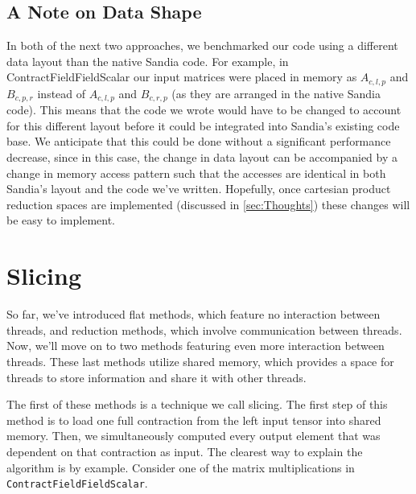 
\subsection{A Note on Data Shape}
In both of the next two approaches, we benchmarked our code using a different data layout than the native
Sandia code. For example, in ContractFieldFieldScalar our input matrices were placed in memory as $A_{c,l,p}$ and
$B_{c,p,r}$ instead of $A_{c,l,p}$ and $B_{c,r,p}$ (as they are arranged in the native Sandia code).
This means that the code we wrote would have to be changed to account for this different layout
before it could be integrated into Sandia's existing code base. We anticipate that this could be done without a
significant performance decrease, since in this case, the change in data layout can be accompanied by a change in 
memory access pattern such that the accesses are identical in both Sandia's layout and the code we've written.
Hopefully, once cartesian product reduction spaces are implemented (discussed in \ref{sec:Thoughts}) these 
changes will be easy to implement. 
\section{Slicing} \label{sec:Slicing}
So far, we've introduced flat methods, which feature no interaction between threads, and reduction
methods, which involve communication between threads. Now, we'll move on to two methods
featuring even more interaction between threads. These last methods utilize shared memory, 
which provides a space for threads to store information and share it with other threads. 

The first of these methods is a technique we call slicing. The first
step of this method is to load one full contraction from the left input tensor into
shared memory. Then, we simultaneously computed every output element that was
dependent on that contraction as input. The clearest way to explain the
algorithm is by example. Consider one of the matrix multiplications in
\texttt{ContractFieldFieldScalar}. 

